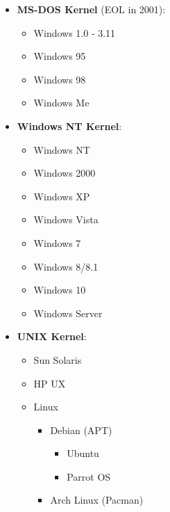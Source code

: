 \documentclass[
]{article}
\providecommand{\tightlist}{%
  \setlength{\itemsep}{0pt}\setlength{\parskip}{0pt}}
\begin{document}
\begin{itemize}
\tightlist
\item
  \textbf{MS-DOS Kernel} (EOL in 2001):

  \begin{itemize}
  \tightlist
  \item
    Windows 1.0 - 3.11
  \item
    Windows 95
  \item
    Windows 98
  \item
    Windows Me
  \end{itemize}
\item
  \textbf{Windows NT Kernel}:

  \begin{itemize}
  \tightlist
  \item
    Windows NT
  \item
    Windows 2000
  \item
    Windows XP
  \item
    Windows Vista
  \item
    Windows 7
  \item
    Windows 8/8.1
  \item
    Windows 10
  \item
    Windows Server
  \end{itemize}
\item
  \textbf{UNIX Kernel}:

  \begin{itemize}
  \tightlist
  \item
    Sun Solaris
  \item
    HP UX
  \item
    Linux

    \begin{itemize}
    \tightlist
    \item
      Debian (APT)

      \begin{itemize}
      \tightlist
      \item
        Ubuntu
      \item
        Parrot OS
      \end{itemize}
    \item
      Arch Linux (Pacman)


\end{itemize}
\end{itemize}
\end{itemize}
\end{document}
